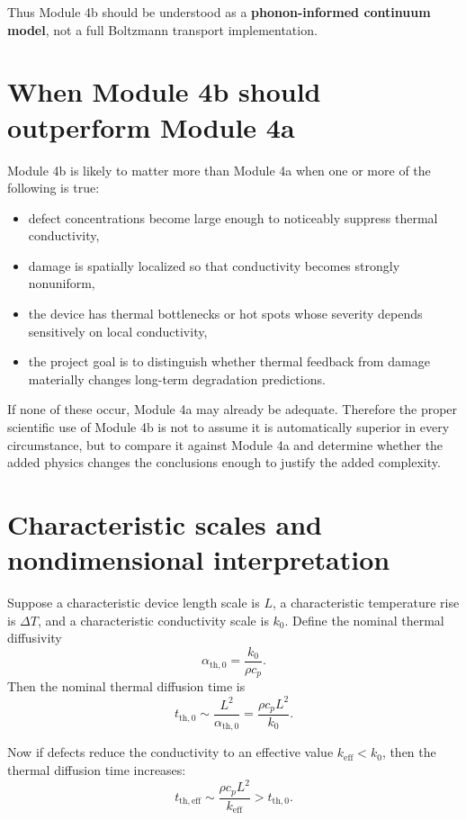 \documentclass[11pt]{article}
\begin{document}
Thus Module 4b should be understood as a \textbf{phonon-informed continuum model}, not a full Boltzmann transport implementation.

\section{When Module 4b should outperform Module 4a}

Module 4b is likely to matter more than Module 4a when one or more of the following is true:
\begin{itemize}
    \item defect concentrations become large enough to noticeably suppress thermal conductivity,
    \item damage is spatially localized so that conductivity becomes strongly nonuniform,
    \item the device has thermal bottlenecks or hot spots whose severity depends sensitively on local conductivity,
    \item the project goal is to distinguish whether thermal feedback from damage materially changes long-term degradation predictions.
\end{itemize}

If none of these occur, Module 4a may already be adequate. Therefore the proper scientific use of Module 4b is not to assume it is automatically superior in every circumstance, but to compare it against Module 4a and determine whether the added physics changes the conclusions enough to justify the added complexity.

\section{Characteristic scales and nondimensional interpretation}

Suppose a characteristic device length scale is $L$, a characteristic temperature rise is $\Delta T$, and a characteristic conductivity scale is $k_0$. Define the nominal thermal diffusivity
\begin{equation}
 \alpha_{\mathrm{th},0} = \frac{k_0}{\rho c_p}.
\end{equation}
Then the nominal thermal diffusion time is
\begin{equation}
 t_{\mathrm{th},0} \sim \frac{L^2}{\alpha_{\mathrm{th},0}} = \frac{\rho c_p L^2}{k_0}.
\end{equation}

Now if defects reduce the conductivity to an effective value $k_{\mathrm{eff}}<k_0$, then the thermal diffusion time increases:
\begin{equation}
 t_{\mathrm{th,eff}} \sim \frac{\rho c_p L^2}{k_{\mathrm{eff}}} > t_{\mathrm{th},0}.
\end{equation}
\end{document}
